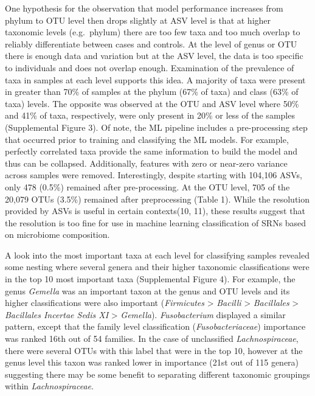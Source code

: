 \documentclass[]{article}
\begin{document}
One hypothesis for the observation that model performance increases from
phylum to OTU level then drops slightly at ASV level is that at higher
taxonomic levels (e.g.~phylum) there are too few taxa and too much
overlap to reliably differentiate between cases and controls. At the
level of genus or OTU there is enough data and variation but at the ASV
level, the data is too specific to individuals and does not overlap
enough. Examination of the prevalence of taxa in samples at each level
supports this idea. A majority of taxa were present in greater than 70\%
of samples at the phylum (67\% of taxa) and class (63\% of taxa) levels.
The opposite was observed at the OTU and ASV level where 50\% and 41\%
of taxa, respectively, were only present in 20\% or less of the samples
(Supplemental Figure 3). Of note, the ML pipeline includes a
pre-processing step that occurred prior to training and classifying the
ML models. For example, perfectly correlated taxa provide the same
information to build the model and thus can be collapsed. Additionally,
features with zero or near-zero variance across samples were removed.
Interestingly, despite starting with 104,106 ASVs, only 478 (0.5\%)
remained after pre-processing. At the OTU level, 705 of the 20,079 OTUs
(3.5\%) remained after preprocessing (Table 1). While the resolution
provided by ASVs is useful in certain contexts(10, 11), these results
suggest that the resolution is too fine for use in machine learning
classification of SRNs based on microbiome composition.

A look into the most important taxa at each level for classifying
samples revealed some nesting where several genera and their higher
taxonomic classifications were in the top 10 most important taxa
(Supplemental Figure 4). For example, the genus \emph{Gemella} was an
important taxon at the genus and OTU levels and its higher
classifications were also important (\emph{Firmicutes} \textgreater{}
\emph{Bacilli} \textgreater{} \emph{Bacillales} \textgreater{}
\emph{Bacillales Incertae Sedis XI} \textgreater{} \emph{Gemella}).
\emph{Fusobacterium} displayed a similar pattern, except that the family
level classification (\emph{Fusobacteriaceae}) importance was ranked
16th out of 54 families. In the case of unclassified
\emph{Lachnospiraceae}, there were several OTUs with this label that
were in the top 10, however at the genus level this taxon was ranked
lower in importance (21st out of 115 genera) suggesting there may be
some benefit to separating different taxonomic groupings within
\emph{Lachnospiraceae}.
\end{document}
